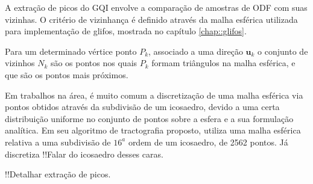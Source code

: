 \documentclass[
    12pt,                %
    oneside,            %
    a4paper,            %
    english,            %
    french,                %
    spanish,            %
    brazil                %
    ]{abntex2}
\begin{document}
A extração de picos do GQI envolve a comparação de amostras de ODF com suas vizinhas. O critério de vizinhança é definido através da malha esférica utilizada para implementação de glifos, mostrada no capítulo \ref{chap::glifos}.

Para um determinado vértice ponto $P_k$, associado a uma direção $\mathbf{u}_k$ o conjunto de vizinhos $N_k$ são os pontos nos quais $P_k$ formam triângulos na malha esférica, e que são os pontos mais próximos.

Em trabalhos na área, é muito comum a discretização de uma malha esférica via pontos obtidos através da subdivisão de um icosaedro, devido a uma certa distribuição uniforme no conjunto de pontos sobre a esfera e a sua formulação analítica. Em seu algoritmo de tractografia proposto,  utiliza uma malha esférica relativa a uma subdivisão de $16^a$ ordem de um icosaedro, de 2562 pontos. Já  discretiza !!Falar do icosaedro desses caras.











!!Detalhar extração de picos.
\end{document}
